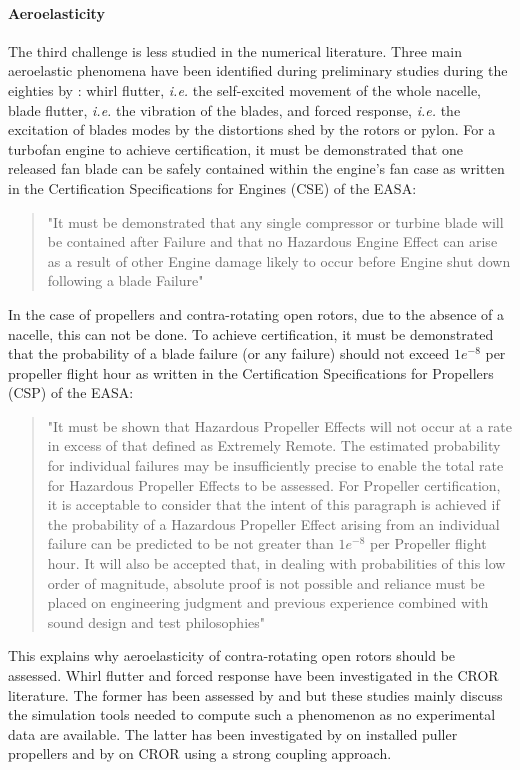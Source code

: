\paragraph{Aeroelasticity}
The third challenge is less studied in the numerical literature.
Three main aeroelastic phenomena have been identified during preliminary studies
during the eighties by \citet{Hager1988}: whirl flutter, \emph{i.e.} the self-excited
movement of the whole nacelle, blade flutter, \emph{i.e.} the vibration
of the blades, and forced response, \emph{i.e.} the excitation of blades modes
by the distortions shed by the rotors or pylon.
For a turbofan engine to achieve certification, it must be 
demonstrated that one released fan blade can be safely contained 
within the engine’s fan case as written in the 
Certification Specifications for Engines (CSE) of the EASA:
\begin{quote}
	"It must be demonstrated that any single compressor or turbine blade will be contained after Failure and 
that no Hazardous Engine Effect can arise as a result of other Engine damage likely to occur before 
Engine shut down following a blade Failure"
\end{quote}
In the case of propellers and contra-rotating open rotors, due to the absence of a nacelle,
this can not be done. To achieve certification, it must be demonstrated that the probability of a blade
failure (or any failure) should not exceed $1e^{-8}$ per propeller flight hour as written in 
the Certification Specifications for Propellers (CSP) of the EASA:
\begin{quote}
	"It must be shown that Hazardous Propeller Effects will not occur at a rate in excess of that defined 
as Extremely Remote. The estimated probability for individual failures may be insufficiently precise 
to enable the total rate for Hazardous Propeller Effects to be assessed. For Propeller certification, it 
is acceptable to consider that the intent of this paragraph is achieved if the probability of a 
Hazardous Propeller Effect arising from an individual failure can be predicted to be not greater than 
$1e^{-8}$ per Propeller flight hour. It will also be accepted that, in dealing with probabilities of this low 
order of magnitude, absolute proof is not possible and reliance must be placed on engineering 
judgment and previous experience combined with sound design and test philosophies" 
\end{quote}
This explains why aeroelasticity of contra-rotating open rotors should be assessed.
Whirl flutter and forced response have been investigated
in the CROR literature. The former has been assessed by \citet{CISicot2011a} and 
\citet{Verley2013} but these studies mainly
discuss the simulation tools needed to compute such a phenomenon as
no experimental data are available.
The latter has been investigated by \citet{Ruiz-Calavera2012}
on installed puller propellers and by \citet{Laban2010} on
CROR using a strong coupling approach. 
